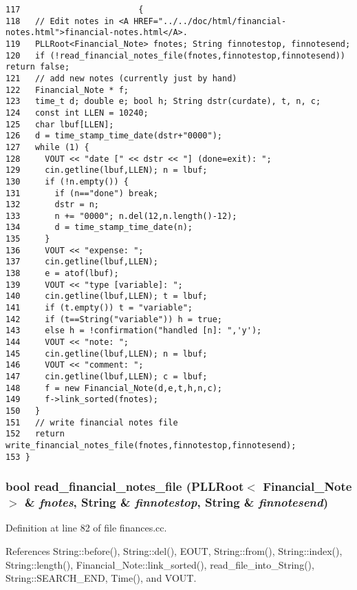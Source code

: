 \footnotesize\begin{verbatim}117                        {
118   // Edit notes in <A HREF="../../doc/html/financial-notes.html">financial-notes.html</A>.
119   PLLRoot<Financial_Note> fnotes; String finnotestop, finnotesend;
120   if (!read_financial_notes_file(fnotes,finnotestop,finnotesend)) return false;
121   // add new notes (currently just by hand)
122   Financial_Note * f;
123   time_t d; double e; bool h; String dstr(curdate), t, n, c;
124   const int LLEN = 10240;
125   char lbuf[LLEN];
126   d = time_stamp_time_date(dstr+"0000");
127   while (1) {
128     VOUT << "date [" << dstr << "] (done=exit): ";
129     cin.getline(lbuf,LLEN); n = lbuf;
130     if (!n.empty()) {
131       if (n=="done") break;
132       dstr = n;
133       n += "0000"; n.del(12,n.length()-12);
134       d = time_stamp_time_date(n);
135     }
136     VOUT << "expense: ";
137     cin.getline(lbuf,LLEN);
138     e = atof(lbuf);
139     VOUT << "type [variable]: ";
140     cin.getline(lbuf,LLEN); t = lbuf;
141     if (t.empty()) t = "variable";
142     if (t==String("variable")) h = true;
143     else h = !confirmation("handled [n]: ",'y');
144     VOUT << "note: ";
145     cin.getline(lbuf,LLEN); n = lbuf;
146     VOUT << "comment: ";
147     cin.getline(lbuf,LLEN); c = lbuf;
148     f = new Financial_Note(d,e,t,h,n,c);
149     f->link_sorted(fnotes);
150   }
151   // write financial notes file
152   return write_financial_notes_file(fnotes,finnotestop,finnotesend);
153 }
\end{verbatim}\normalsize 
{}
\subsubsection{\setlength{\rightskip}{0pt plus 5cm}bool read\_\-financial\_\-notes\_\-file ({\bf PLLRoot}$<$ {\bf Financial\_\-Note} $>$ \& {\em fnotes}, {\bf String} \& {\em finnotestop}, {\bf String} \& {\em finnotesend})}\label{finances_8cc_a0}




Definition at line 82 of file finances.cc.

References String::before(), String::del(), EOUT, String::from(), String::index(), String::length(), Financial\_\-Note::link\_\-sorted(), read\_\-file\_\-into\_\-String(), String::SEARCH\_\-END, Time(), and VOUT.

